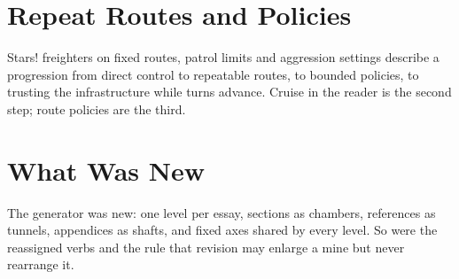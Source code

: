 \documentclass{article}
\begin{document}
\section{Repeat Routes and Policies}\label{sec:games-routes}
Stars! freighters on fixed routes, patrol limits and aggression settings describe a progression from direct control to repeatable routes, to bounded policies, to trusting the infrastructure while turns advance. Cruise in the reader is the second step; route policies are the third.
\section{What Was New}\label{sec:games-new}
The generator was new: one level per essay, sections as chambers, references as tunnels, appendices as shafts, and fixed axes shared by every level. So were the reassigned verbs and the rule that revision may enlarge a mine but never rearrange it.
\end{document}
